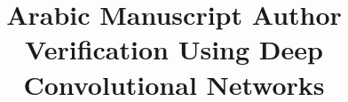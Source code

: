 \documentclass[conference,a4paper,twocolumn]{IEEEtran}
\begin{document}


\title{Arabic Manuscript Author Verification Using Deep Convolutional Networks}



\end{document}
